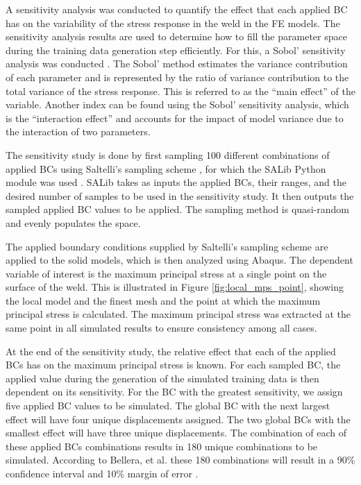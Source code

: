 A sensitivity analysis was conducted to quantify the effect that each applied BC
has on the variability of the stress response in the weld in the FE models. The
sensitivity analysis results are used to determine how to fill the parameter
space during the training data generation step efficiently. For this, a Sobol’
sensitivity analysis was conducted \cite{sobol1990sensitivity}. The Sobol’
method estimates the variance contribution of each parameter and is represented
by the ratio of variance contribution to the total variance of the stress
response. This is referred to as the ``main effect'' of the variable.  Another
index can be found using the Sobol’ sensitivity analysis, which is the
``interaction effect'' and accounts for the impact of model variance due to the
interaction of two parameters.

The sensitivity study is done by first sampling 100 different combinations of
applied BCs using Saltelli’s sampling scheme \cite{saltelli2010variance}, for
which the SALib Python module was used \cite{Herman2017}. SALib takes as inputs
the applied BCs, their ranges, and the desired number of samples to be used in
the sensitivity study.  It then outputs the sampled applied BC values to be
applied. The sampling method is quasi-random and evenly populates the space.

The applied boundary conditions supplied by Saltelli's sampling scheme are
applied to the solid models, which is then analyzed using Abaqus. The dependent
variable of interest is the maximum principal stress at a single point on the
surface of the weld. This is illustrated in Figure \ref{fig:local_mps_point},
showing the local model and the finest mesh and the point at which the maximum
principal stress is calculated. The maximum principal stress was extracted at
the same point in all simulated results to ensure consistency among all cases.

At the end of the sensitivity study, the relative effect that each of the
applied BCs has on the maximum principal stress is known. For each sampled BC,
the applied value during the generation of the simulated training data is then
dependent on its sensitivity. For the BC with the greatest sensitivity, we assign
five applied BC values to be simulated. The global BC with the next largest
effect will have four unique displacements assigned.  The two global BCs with
the smallest effect will have three unique displacements.  The combination of
each of these applied BCs combinations results in 180 unique combinations to be
simulated.  According to Bellera, et al. these 180 combinations will result in a
90\% confidence interval and 10\% margin of error \cite{bellera2007method}. 

